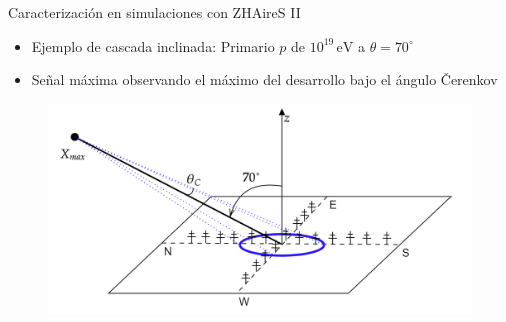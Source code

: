 \documentclass{beamer}
\begin{document}
\begin{frame}{Caracterización en simulaciones con ZHAireS II}
	\begin{itemize}
		\item Ejemplo de cascada inclinada: Primario $p$ de $10^{19}\,\mathrm{eV}$ a $\theta = 70^\circ$
		\item Señal máxima observando el máximo del desarrollo bajo el ángulo \v{C}erenkov 
	\end{itemize}
	\begin{figure}[H]
		\centering
		\includegraphics[width=.7\linewidth]{figures/radio/ANITApaper_showscheme}
	\end{figure}
\end{frame}
\end{document}
